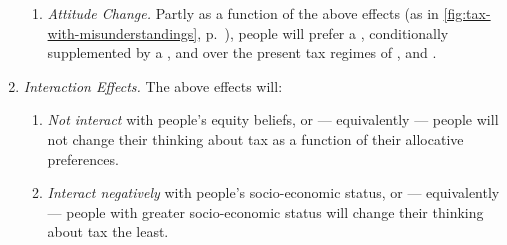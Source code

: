 \begin{enumerate}
\begin{enumerate}
				
				
			\item \label{itm:attitude-change}
				\emph{Attitude Change.}
				Partly as a function of the above effects (as in \autoref{fig:tax-with-misunderstandings}, p.~\pageref{fig:tax-with-misunderstandings}), %
				 people will prefer a , conditionally supplemented by a ,  and  over the present tax regimes of ,  and .
		\end{enumerate}
	
	\item \label{itm:interaction-effects}
		\emph{Interaction Effects.}
		The above effects will:
			\begin{enumerate}
				\item \label{itm:interact-equity}
					\emph{Not interact} with people's equity beliefs, or --- equivalently --- people will not change their thinking about tax as a function of their allocative preferences.
				\item \label{itm:interact-ses}
					\emph{Interact negatively} with people's socio-economic status, or --- equivalently --- people with greater socio-economic status will change their thinking about tax the least.
			\end{enumerate}
\end{enumerate}
    


